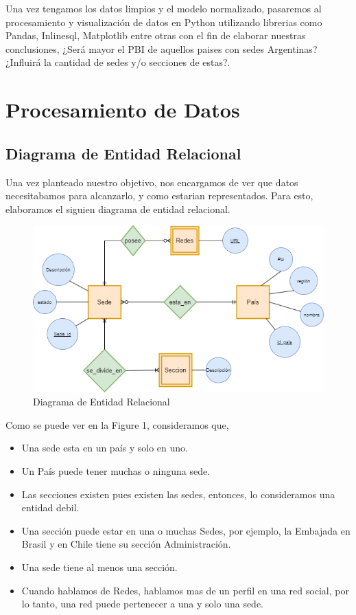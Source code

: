 \documentclass[10pt,a4paper]{article}
\begin{document}
Una vez tengamos los datos limpios y el modelo normalizado, pasaremos al procesamiento y visualización de datos en Python utilizando librerias como Pandas, Inlinesql, Matplotlib entre otras con el fin de elaborar nuestras conclusiones, ¿Será mayor el PBI de aquellos paises con sedes Argentinas? ¿Influirá la cantidad de sedes y/o secciones de estas?.  

\newpage

\section{Procesamiento de Datos} \vspace{0.2cm}

\subsection{Diagrama de Entidad Relacional} \vspace{0.2cm}

Una vez planteado nuestro objetivo, nos encargamos de ver que datos necesitabamos para alcanzarlo, y como estarian representados. Para esto, elaboramos el siguien diagrama de entidad
relacional.  \vspace{0.2cm}

\begin{figure}[ht]
	\centering
	\includegraphics[width=1\textwidth]{DERPBI.png}
	\caption{Diagrama de Entidad Relacional}
	\label{fig:ejemplo}
\end{figure}

Como se puede ver en la Figure 1, consideramos que,

\begin{itemize}
	\item Una sede esta en un país y solo en uno.
	\item Un País puede tener muchas o ninguna sede.
	\item Las secciones existen pues existen las sedes, entonces, lo consideramos una entidad debil.
	\item Una sección puede estar en una o muchas Sedes, por ejemplo, la Embajada en Brasil y en Chile tiene su sección Administración.
	\item Una sede tiene al menos una sección.
	\item Cuando hablamos de Redes, hablamos mas de un perfil en una red social, por lo tanto, una red puede pertenecer a una y solo una sede.
\end{itemize}
\end{document}
